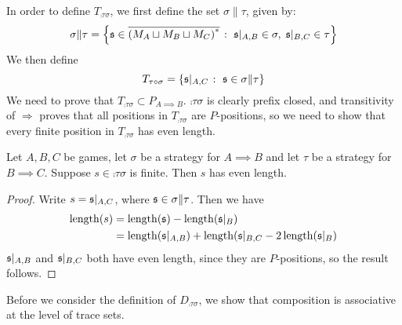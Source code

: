 \documentclass{article}
\begin{document}
In order to define $T_{\comp\tau\sigma}$, we first define the set $\sigma\|\tau$, given by:
\[
  \sigma\|\tau = \left\{\mathfrak s\in{\overline{{(M_A\sqcup M_B\sqcup M_C)}^{*}}}\;\colon\; \mathfrak s\vert_{A,B}\in\sigma,\;\mathfrak s\vert_{B,C}\in\tau\right\}
  \]
We then define
\[
  T_{\tau \circ \sigma} = \{\mathfrak s\vert_{A,C}\;\colon\; \mathfrak s\in\sigma\|\tau\}
  \]
We need to prove that $T_{\comp\tau\sigma}\subset P_{A\implies B}$.  $\comp\tau\sigma$ is clearly prefix closed, and transitivity of $\Rightarrow$ proves that all positions in $T_{\comp\tau\sigma}$ are $P$-positions, so we need to show that every finite position in $T_{\comp\tau\sigma}$ has even length.

\begin{proposition}
  Let $A,B,C$ be games, let $\sigma$ be a strategy for $A\implies B$ and let $\tau$ be a strategy for $B\implies C$.  Suppose $s\in\comp\tau\sigma$ is finite.  Then $s$ has even length.
  \begin{proof}
    Write $s=\mathfrak s\vert_{A,C}$, where $\mathfrak s\in\sigma\|\tau$.  Then we have
    \begin{align*}
      \operatorname{length}(s) & = \operatorname{length}(\mathfrak s) - \operatorname{length}(\mathfrak s\vert_B) \\
       & = \operatorname{length}(\mathfrak s\vert_{A,B}) + \operatorname{length}(\mathfrak s\vert_{B,C} - 2\operatorname{length}(\mathfrak s\vert_B)
    \end{align*}
    $\mathfrak s\vert_{A,B}$ and $\mathfrak s\vert_{B,C}$ both have even length, since they are $P$-positions, so the result follows.
  \end{proof}
\end{proposition}

Before we consider the definition of $D_{\comp\tau\sigma}$, we show that composition is associative at the level of trace sets.  
\end{document}
